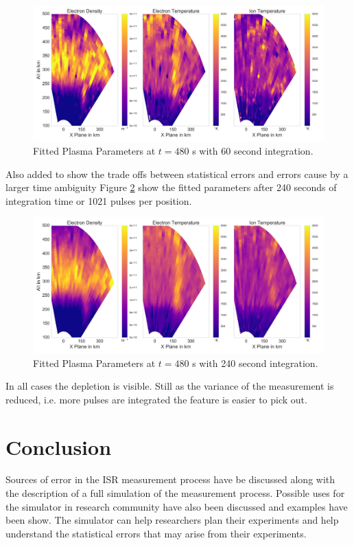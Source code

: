 \documentclass[draft,ras]{agutex}
\begin{document}
\begin{article}


\begin{figure}[!t]
\centering
\includegraphics[width=5in]{0480_60_int}
\caption{Fitted Plasma Parameters at $t=480$ s with 60 second integration.}
\label{fig:fplparamst60}
\end{figure}


Also added to show the trade offs between statistical errors and errors cause by a larger time ambiguity Figure \ref{fig:f240plparamst60} show the fitted parameters after 240 seconds of integration time or 1021 pulses per position. 


\begin{figure}[!t]
\centering
\includegraphics[width=5in]{0480_240_int}
\caption{Fitted Plasma Parameters at $t=480$ s with 240 second integration.}
\label{fig:f240plparamst60}
\end{figure}


In all cases the depletion is visible. Still as the variance of the measurement is reduced, i.e. more pulses are integrated the feature is easier to pick out. 
\section{Conclusion}
Sources of error in the ISR measurement process have be discussed along with the description of a full simulation of the measurement process. Possible uses for the simulator in research community have also been discussed and examples have been show. The simulator can help researchers plan their experiments and help understand the statistical errors that may arise from their experiments. 


\end{article}
\end{document}
